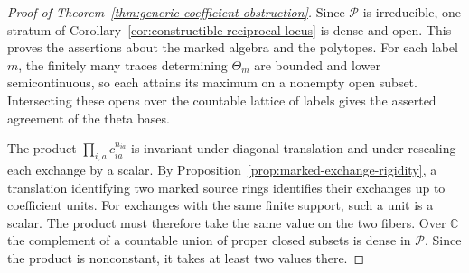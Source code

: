 \documentclass[11pt,reqno]{amsart}
\numberwithin{equation}{section}
\theoremstyle{definition}
\theoremstyle{remark}
\begin{document}
\begin{proof}[Proof of Theorem~\ref{thm:generic-coefficient-obstruction}]
Since \(\mathcal P\) is irreducible, one stratum of
Corollary~\ref{cor:constructible-reciprocal-locus} is dense and open.
This proves the assertions about the marked algebra and the polytopes.
For each label \(m\), the finitely many traces determining \(\Theta_m\)
are bounded and lower semicontinuous, so each attains its maximum on
a nonempty open subset. Intersecting these opens over the countable
lattice of labels gives the asserted agreement of the theta bases.

The product \(\prod_{i,a}c_{ia}^{n_{ia}}\) is invariant under diagonal
translation and under rescaling each exchange by a scalar. By
Proposition~\ref{prop:marked-exchange-rigidity}, a translation
identifying two marked source rings identifies their exchanges up to
coefficient units. For exchanges with the same finite support, such a
unit is a scalar. The product must therefore take the same value on
the two fibers. Over \(\mathbb C\) the complement of a countable
union of proper closed subsets is dense in \(\mathcal P\). Since the
product is nonconstant, it takes at least two values there.
\end{proof}
\end{document}
